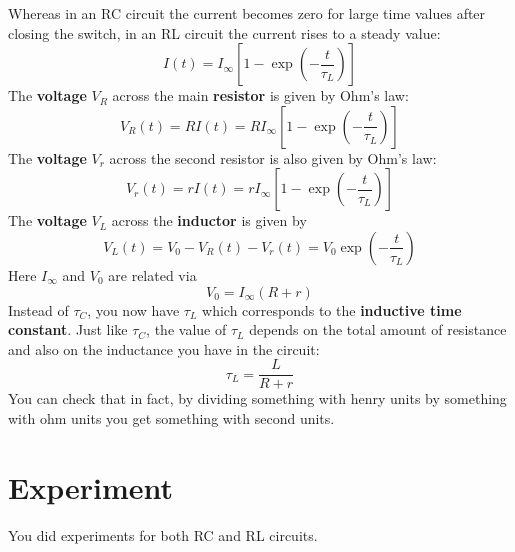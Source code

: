 Whereas in an RC circuit the current becomes zero for large time values after closing the switch, in an RL circuit the current rises to a steady value:
\begin{equation}
    I(t) = I_{\infty} \left[ 1 - \exp\left(- \frac{t}{\tau_{L}}\right) \right]
    \label{eq.05.RL.i.rise}
\end{equation}
The \textbf{voltage} $V_{R}$ across the main \textbf{resistor} is given by Ohm's law:
\begin{equation}
    V_{R}(t) = R I(t) = R I_{\infty} \left[ 1 - \exp\left(- \frac{t}{\tau_{L}}\right) \right]
    \label{eq.05.RL.vR}
\end{equation}
The \textbf{voltage} $V_{r}$ across the second resistor is also given by Ohm's law:
\begin{equation}
    V_{r}(t) = r I(t) = r I_{\infty} \left[ 1 - \exp\left(- \frac{t}{\tau_{L}}\right) \right]
    \label{eq.05.RL.vr}
\end{equation}
The \textbf{voltage} $V_{L}$ across the \textbf{inductor} is given by
\begin{equation}
    V_{L}(t) = V_{0} - V_{R}(t) - V_{r}(t) = V_{0} \exp\left(- \frac{t}{\tau_{L}}\right)
    \label{eq.05.RL.vL}
\end{equation}
Here $I_{\infty}$ and $V_{0}$ are related via
\begin{equation}
    V_{0} = I_{\infty} \left(R + r\right)
\end{equation}
Instead of $\tau_{C}$, you now have $\tau_{L}$ which corresponds to the \textbf{inductive time constant}. Just like $\tau_{C}$, the value of $\tau_{L}$ depends on the total amount of resistance and also on the inductance you have in the circuit:
\begin{equation}
    \tau_{L} = \frac{L}{R + r}
    \label{eq.05.tauL}
\end{equation}
You can check that in fact, by dividing something with henry units by something with ohm units you get something with second units.
\section{Experiment}
You did experiments for both RC and RL circuits.

